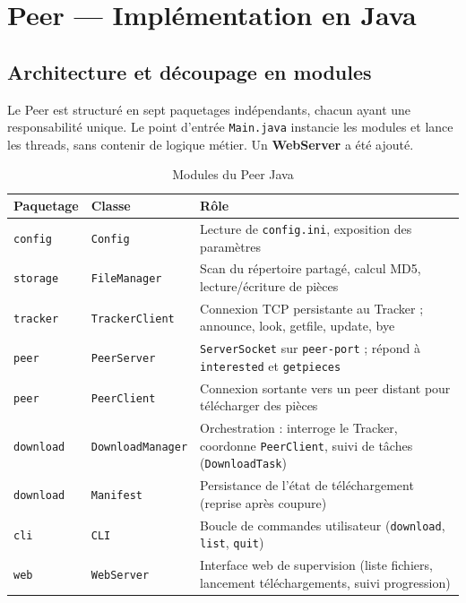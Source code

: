 \documentclass[11pt, a4paper]{article}
\begin{document}
\section{Peer --- Implémentation en Java}

\subsection{Architecture et découpage en modules}

Le Peer est structuré en sept paquetages indépendants, chacun ayant une
responsabilité unique. Le point d'entrée \texttt{Main.java} instancie les
modules et lance les threads, sans contenir de logique métier.
Un \textbf{WebServer} a été ajouté.

\begin{table}[H]
\centering
\begin{tabularx}{0.95\textwidth}{llX}
\toprule
\textbf{Paquetage} & \textbf{Classe} & \textbf{Rôle} \\
\midrule
\texttt{config}   & \texttt{Config}          & Lecture de \texttt{config.ini}, exposition des paramètres \\
\texttt{storage}  & \texttt{FileManager}     & Scan du répertoire partagé, calcul MD5, lecture/écriture de pièces \\
\texttt{tracker}  & \texttt{TrackerClient}   & Connexion TCP persistante au Tracker ; announce, look, getfile, update, bye \\
\texttt{peer}     & \texttt{PeerServer}      & \texttt{ServerSocket} sur \texttt{peer-port} ; répond à \texttt{interested} et \texttt{getpieces} \\
\texttt{peer}     & \texttt{PeerClient}      & Connexion sortante vers un peer distant pour télécharger des pièces \\
\texttt{download} & \texttt{DownloadManager} & Orchestration : interroge le Tracker, coordonne \texttt{PeerClient}, suivi de tâches (\texttt{DownloadTask}) \\
\texttt{download} & \texttt{Manifest}        & Persistance de l'état de téléchargement (reprise après coupure) \\
\texttt{cli}      & \texttt{CLI}             & Boucle de commandes utilisateur (\texttt{download}, \texttt{list}, \texttt{quit}) \\
\texttt{web}      & \texttt{WebServer}       & Interface web de supervision (liste fichiers, lancement téléchargements, suivi progression) \\
\bottomrule
\end{tabularx}
\caption{Modules du Peer Java}
\end{table}
\end{document}

